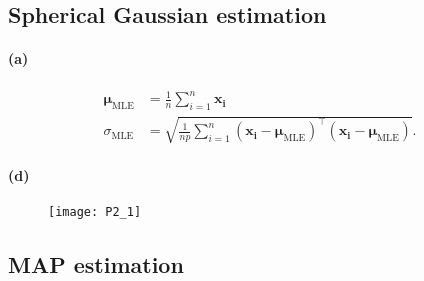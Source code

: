 \documentclass[a4paper,11pt]{article}
\begin{document}
\subsection{Spherical Gaussian estimation}
\paragraph{(a)}
\begin{align*}
\boldsymbol\mu_\mathrm{MLE}&=\frac{1}{n}\sum_{i=1}^n\mathbf{x_i}\\
\sigma_\mathrm{MLE}&=\sqrt{\frac{1}{np}\sum_{i=1}^n(\mathbf{x_i}-\boldsymbol\mu_\mathrm{MLE})^\top(\mathbf{x_i}-\boldsymbol\mu_\mathrm{MLE})}.
\end{align*}
\paragraph{(d)}
\begin{figure}
  \begin{center}
    \texttt{[image: P2\_1]}
  \end{center}
\end{figure}
\subsection{MAP estimation}
\end{document}
